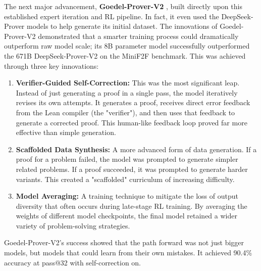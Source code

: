 \documentclass[12pt, letterpaper]{article}
\begin{document}
The next major advancement, \textbf{Goedel-Prover-V2} \citep{lin2025goedelproverv2scalingformaltheorem}, built directly upon this established expert iteration and RL pipeline. In fact, it even used the DeepSeek-Prover models to help generate its initial dataset. The innovations of Goedel-Prover-V2 demonstrated that a smarter training process could dramatically outperform raw model scale; its 8B parameter model successfully outperformed the 671B DeepSeek-Prover-V2 on the MiniF2F benchmark. This was achieved through three key innovations: \begin{enumerate} \item \textbf{Verifier-Guided Self-Correction:} This was the most significant leap. Instead of just generating a proof in a single pass, the model iteratively revises its own attempts. It generates a proof, receives direct error feedback from the Lean compiler (the "verifier"), and then uses that feedback to generate a corrected proof. This human-like feedback loop proved far more effective than simple generation. \item \textbf{Scaffolded Data Synthesis:} A more advanced form of data generation. If a proof for a problem failed, the model was prompted to generate simpler related problems. If a proof succeeded, it was prompted to generate harder variants. This created a "scaffolded" curriculum of increasing difficulty. \item \textbf{Model Averaging:} A training technique to mitigate the loss of output diversity that often occurs during late-stage RL training. By averaging the weights of different model checkpoints, the final model retained a wider variety of problem-solving strategies. \end{enumerate} Goedel-Prover-V2's success showed that the path forward was not just bigger models, but models that could learn from their own mistakes. It achieved 90.4\% accuracy at pass@32 with self-correction on.
\end{document}
